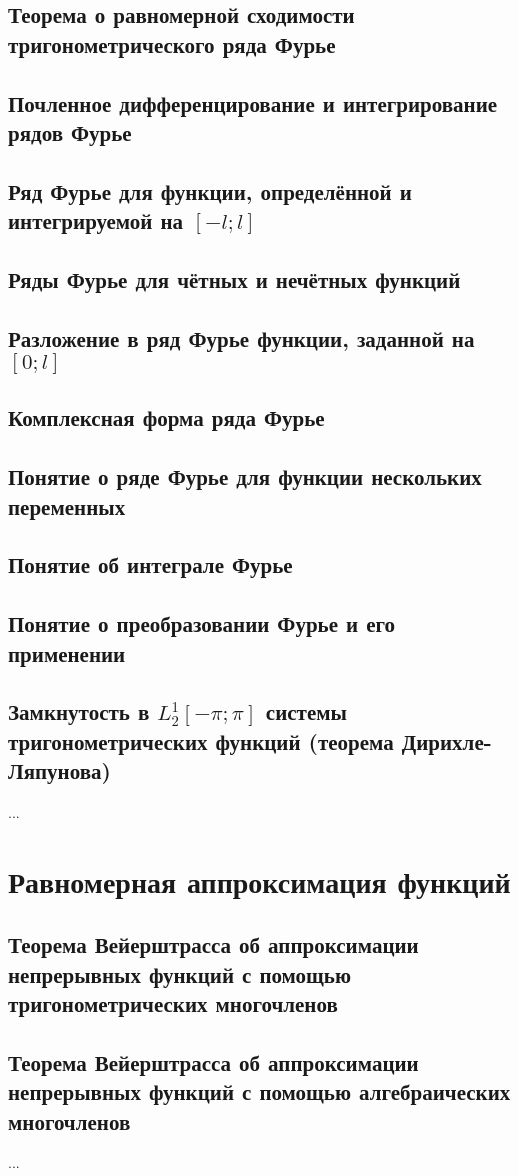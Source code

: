 \subsection{Теорема о равномерной сходимости тригонометрического ряда Фурье}
\subsection{Почленное дифференцирование и интегрирование рядов Фурье}
\subsection{Ряд Фурье для функции, определённой и интегрируемой на $[-l;l]$}
\subsection{Ряды Фурье для чётных и нечётных функций}
\subsection{Разложение в ряд Фурье функции, заданной на $[0;l]$}
\subsection{Комплексная форма ряда Фурье}
\subsection{Понятие о ряде Фурье для функции нескольких переменных}
\subsection{Понятие об интеграле Фурье}
\subsection{Понятие о преобразовании Фурье и его применении}
\subsection{Замкнутость в $L_2^1 [-\pi;\pi]$ системы тригонометрических функций (теорема Дирихле-Ляпунова) }
...

\section{Равномерная аппроксимация функций}
\subsection{Теорема Вейерштрасса об аппроксимации непрерывных функций с помощью тригонометрических многочленов}
\subsection{Теорема Вейерштрасса об аппроксимации непрерывных функций с помощью алгебраических многочленов}
...

